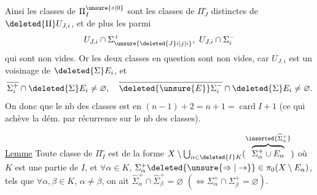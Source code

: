 Ainsi les classes de $\Pi_I^{\unsure{\circ|0}}$ sont les classes de $\Pi_J^\circ$ distinctes de $\deleted{\Pi}U_{J,i}$, et de plus les  parmi
\[
U_{J,i}\cap\Sigma_{\unsure{\deleted{J}i|j|i}}^+,\ U_{J,i}\cap\Sigma_i^-
\]
qui sont non vides. Or les deux classes en question sont non vides, car  $U_{J,i}$ est un voisinage de $\deleted{\Sigma}E_i$, et
\[
\overline{\Sigma_i^+}\cap\deleted{\Sigma}E_i\ne\varnothing,\quad
\overline{\deleted{\unsure{E}}\Sigma_i^-}\cap\deleted{\Sigma}E_i\ne\varnothing.
\]
On  donc que le nb des classes est en  $(n-1)+2=n+1=\operatorname{card} I+1$ (ce qui achève  la dém. par récurrence sur le nb des classes).

\uline{Lemme} Toute classe de $\Pi_I^\circ$ est de la forme $X\setminus\bigcup_{\alpha\in\deleted{I}K}(\overbrace{\Sigma_\alpha^+\cup E_\alpha}^{\inserted{\widehat{\Sigma}_\alpha^+}})$ où $K$ est une partie  de $I$, et
\reversemarginpar{}\normalmarginpar
$\forall\alpha\in K$,  $\Sigma_\alpha^+\deleted{\unsure{\Rightarrow|\to}}\in\pi_0(X\setminus E_\alpha)$, tels que $\forall\alpha,\beta\in K$, $\alpha\ne\beta$, on ait $\widehat{\Sigma}_\alpha^+\cap\widehat{\Sigma}_\beta^+=\varnothing$ $(\Longleftrightarrow\Sigma_\alpha^+\cap\Sigma_\beta^+=\varnothing)$.
